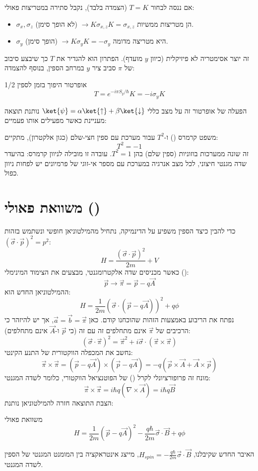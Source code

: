 אם ננסה לבחור $T=K$ (הצמדה בלבד), נקבל סתירה במטריצות פאולי:
\begin{itemize}
    \item $\sigma_x, \sigma_z$ הן מטריצות ממשיות $\to K\sigma_{x,z}K = \sigma_{x,z}$ (לא הופך סימן).
    \item $\sigma_y$ היא מטריצה מדומה $\to K\sigma_y K = -\sigma_y$ (הופך סימן).
\end{itemize}
זה יוצר אסימטריה לא פיזיקלית (כיוון $y$ מועדף). הפתרון הוא להגדיר את $T$ כך שיבצע סיבוב של $\pi$ סביב ציר $y$ במרחב הספין, בנוסף להצמדה:
\begin{resultbox}{אופרטור היפוך בזמן לספין 1/2}
$$ T = e^{-i\pi S_y / \hbar} K = -i\sigma_y K $$
\end{resultbox}
הפעלה של אופרטור זה על מצב כללי $\ket{\psi} = \alpha\ket{\uparrow} + \beta\ket{\downarrow}$ נותנת תוצאה מעניינת כאשר מפעילים אותו פעמיים:
\begin{theorembox}{משפט קרמרס () ו-$T^2$}
עבור מערכת עם ספין חצי-שלם (כגון אלקטרון), מתקיים:
$$ T^2 = -1 $$
זה שונה ממערכות בוזוניות (ספין שלם) בהן $T^2 = 1$. עובדה זו מובילה לניוון קרמרס: בהיעדר שדה מגנטי חיצוני, לכל מצב אנרגיה במערכת עם מספר אי-זוגי של פרמיונים יש לפחות ניוון כפול.
\end{theorembox}

\section{משוואת פאולי ()}

כדי להבין כיצד הספין משפיע על הדינמיקה, נתחיל מהמילטוניאן חופשי ונשתמש בזהות $(\vec{\sigma}\cdot\vec{p})^2 = p^2$:
$$ H = \frac{(\vec{\sigma}\cdot\vec{p})^2}{2m} + V $$
כאשר מכניסים שדה אלקטרומגנטי, מבצעים את הצימוד המינימלי ():
$$ \vec{p} \to \vec{\pi} = \vec{p} - q\vec{A} $$
ההמילטוניאן החדש הוא:
$$ H = \frac{1}{2m} (\vec{\sigma} \cdot (\vec{p} - q\vec{A}))^2 + q\phi $$
נפתח את הריבוע באמצעות הזהות שהוכחנו קודם. כאן $\vec{a} = \vec{b} = \vec{\pi}$, אך יש להיזהר כי הרכיבים של $\vec{\pi}$ אינם מתחלפים זה עם זה (כי $\vec{p}$ ו-$\vec{A}$ אינם מתחלפים):
$$ (\vec{\sigma}\cdot\vec{\pi})^2 = \vec{\pi}^2 + i\vec{\sigma}\cdot(\vec{\pi} \times \vec{\pi}) $$
נחשב את המכפלה הווקטורית של התנע הקינטי:
$$ \vec{\pi} \times \vec{\pi} = (\vec{p} - q\vec{A}) \times (\vec{p} - q\vec{A}) = -q(\vec{p}\times\vec{A} + \vec{A}\times\vec{p}) $$
מונח זה פרופורציונלי לקרל () של הפוטנציאל הווקטורי, כלומר לשדה המגנטי:
$$ \vec{\pi} \times \vec{\pi} = i\hbar q (\nabla \times \vec{A}) = i\hbar q \vec{B} $$
הצבת התוצאה חזרה להמילטוניאן נותנת:
\begin{resultbox}{משוואת פאולי}
$$ H = \frac{1}{2m}(\vec{p} - q\vec{A})^2 - \frac{q\hbar}{2m}\vec{\sigma}\cdot\vec{B} + q\phi $$
\end{resultbox}
האיבר החדש שקיבלנו, $H_{spin} = -\frac{q\hbar}{2m}\vec{\sigma}\cdot\vec{B}$, מייצג אינטראקציה בין המומנט המגנטי של הספין לשדה המגנטי.

